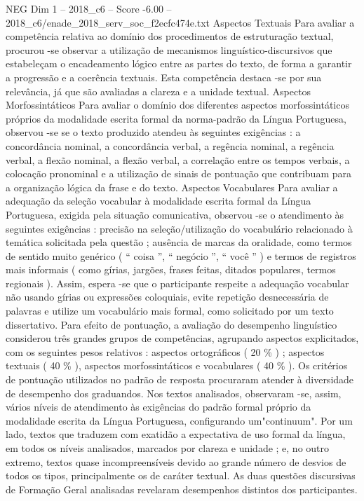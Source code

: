 \begin{textsample}{NEG Dim 1 – 2018\_c6 – Score -6.00 – 2018\_c6/enade\_2018\_serv\_soc\_f2ecfc474e.txt}
Aspectos Textuais Para avaliar a competência relativa ao domínio dos procedimentos de estruturação textual, procurou -se observar a utilização de mecanismos linguístico-discursivos que estabeleçam o encadeamento lógico entre as partes do texto, de forma a garantir a progressão e a coerência textuais.
Esta competência destaca -se por sua relevância, já que são avaliadas a clareza e a unidade textual.
Aspectos Morfossintáticos Para avaliar o domínio dos diferentes aspectos morfossintáticos próprios da modalidade escrita formal da norma-padrão da Língua Portuguesa, observou -se se o texto produzido atendeu às seguintes exigências : a concordância nominal, a concordância verbal, a regência nominal, a regência verbal, a flexão nominal, a flexão verbal, a correlação entre os tempos verbais, a colocação pronominal e a utilização de sinais de pontuação que contribuam para a organização lógica da frase e do texto.
Aspectos Vocabulares Para avaliar a adequação da seleção vocabular à modalidade escrita formal da Língua Portuguesa, exigida pela situação comunicativa, observou -se o atendimento às seguintes exigências : precisão na seleção/utilização do vocabulário relacionado à temática solicitada pela questão ; ausência de marcas da oralidade, como termos de sentido muito genérico ( “ coisa ”, “ negócio ”, “ você ” ) e termos de registros mais informais ( como gírias, jargões, frases feitas, ditados populares, termos regionais ).
Assim, espera -se que o participante respeite a adequação vocabular não usando gírias ou expressões coloquiais, evite repetição desnecessária de palavras e utilize um vocabulário mais formal, como solicitado por um texto dissertativo.
Para efeito de pontuação, a avaliação do desempenho linguístico considerou três grandes grupos de competências, agrupando aspectos explicitados, com os seguintes pesos relativos : aspectos ortográficos ( 20 \% ) ; aspectos textuais ( 40 \% ), aspectos morfossintáticos e vocabulares ( 40 \% ).
Os critérios de pontuação utilizados no padrão de resposta procuraram atender à diversidade de desempenho dos graduandos.
Nos textos analisados, observaram -se, assim, vários níveis de atendimento às exigências do padrão formal próprio da modalidade escrita da Língua Portuguesa, configurando um"continuum".
Por um lado, textos que traduzem com exatidão a expectativa de uso formal da língua, em todos os níveis analisados, marcados por clareza e unidade ; e, no outro extremo, textos quase incompreensíveis devido ao grande número de desvios de todos os tipos, principalmente os de caráter textual.
As duas questões discursivas de Formação Geral analisadas revelaram desempenhos distintos dos participantes.

\end{textsample}
